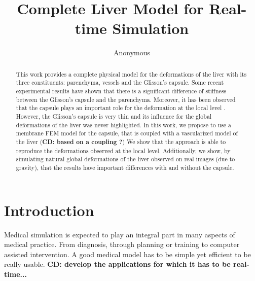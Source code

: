 \documentclass{llncs}
\newcommand{\CD}[1]{{\color{green}\textbf{CD: #1}}}
\begin{document}
%
%
\mainmatter              %
%
\title{Complete Liver Model for Real-time Simulation} %
%
%
\author{Anonymous}
%
%
%
\maketitle

\begin{abstract}
This work provides a complete physical model for the deformations of the liver with its three constituents: parenchyma, vessels and the Glisson's capsule.
Some recent experimental results \cite{Ahn2010} have shown that there is a significant difference of stiffness between the Glisson's capsule and the parenchyma. 
Moreover, it has been observed that the capsule plays an important role for the deformation at the local level \cite{Hollenstein2006}.
However, the Glisson's capsule is very thin and its influence for the global deformations of the liver was never highlighted.
In this work, we propose to use a membrane FEM model for the capsule, that is coupled with a vascularized model of the liver (\CD{based on a coupling ?})
We show that the approach is able to reproduce the deformations observed at the local level.
Additionally, we show, by simulating natural global deformations of the liver observed on real images (due to gravity), that the results have important differences with and without the capsule.

\end{abstract}

\section{Introduction} %

Medical simulation is expected to play an integral part in many aspects of
medical practice. From diagnosis, through planning or training to computer
assisted intervention. A good medical model has to be simple yet efficient
to be really usable.
\CD{develop the applications for which it has to be real-time...}
\end{document}
